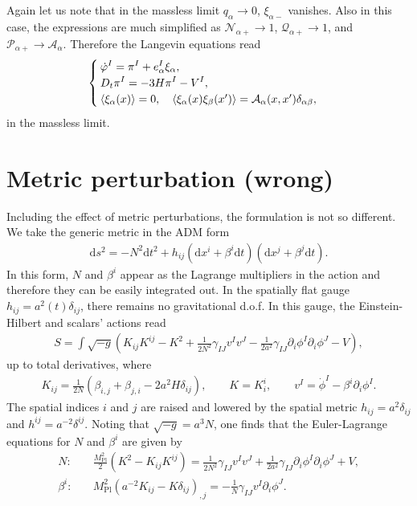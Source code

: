 \documentclass[aps, prd
, preprint
, nofootinbib 
]{revtex4-1}
\newcommand{\dd}{\mathrm{d}}
\newcommand{\Mpl}{M_\text{Pl}}
\newcommand{\bae}[1]{\begin{align} #1 \end{align}}
\newcommand{\bce}[1]{\begin{cases} #1 \end{cases}}
\begin{document}
Again let us note that in the massless limit $q_\alpha\to0$, $\xi_{\alpha-}$ vanishes.
Also in this case, the expressions are much simplified as $\mathcal{N}_{\alpha+}\to1$, $\mathscr{Q}_{\alpha+}\to1$,
and $\mathcal{P}_{\alpha+}\to\mathcal{A}_\alpha$. Therefore the Langevin equations read
\bae{\label{eq: massless}
	\bce{
		\displaystyle
		\dot{\varphi}^I=\pi^I+e^I_\alpha\xi_\alpha, \\
		\displaystyle
		D_t\pi^I=-3H\pi^I-V^I, \\
		\braket{\xi_\alpha(x)}=0, \quad \braket{\xi_\alpha(x)\xi_\beta(x^\prime)}=\mathcal{A}_\alpha(x,x^\prime)\delta_{\alpha\beta},
	}
}
in the massless limit.




\section{Metric perturbation (wrong)}

Including the effect of metric perturbations, the formulation is not so different.
We take the generic metric in the ADM form
\bae{
	\dd s^2=-N^2\dd t^2+h_{ij}(\dd x^i+\beta^i\dd t)(\dd x^j+\beta^j\dd t).
}
In this form, $N$ and $\beta^i$ appear as the Lagrange multipliers in the action and therefore they can be easily integrated out.
In the spatially flat gauge $h_{ij}=a^2(t)\delta_{ij}$, there remains no gravitational d.o.f.
In this gauge, the Einstein-Hilbert and scalars' actions read
\bae{\label{eq: action in ADM}
	S=\int\sqrt{-g}\left(K_{ij}K^{ij}-K^2+\frac{1}{2N^2}\gamma_{IJ}v^Iv^J-\frac{1}{2a^2}\gamma_{IJ}\partial_i\phi^I\partial_i\phi^J-V\right),
}
up to total derivatives, where
\bae{
	K_{ij}=\frac{1}{2N}\left(\beta_{i,j}+\beta_{j,i}-2a^2H\delta_{ij}\right), \quad\quad K=K^i_i, \quad\quad v^I=\dot{\phi}^I-\beta^i\partial_i\phi^I.
}
The spatial indices $i$ and $j$ are raised and lowered by the spatial metric $h_{ij}=a^2\delta_{ij}$ and $h^{ij}=a^{-2}\delta^{ij}$.
Noting that $\sqrt{-g}=a^3N$, one finds that the Euler-Lagrange equations for $N$ and $\beta^i$ are given by
\bae{
	N:&\quad \frac{\Mpl^2}{2}\left(K^2-K_{ij}K^{ij}\right)=\frac{1}{2N^2}\gamma_{IJ}v^Iv^J+\frac{1}{2a^2}\gamma_{IJ}\partial_i\phi^I\partial_i\phi^J+V, 
	\label{eq: EL for N} \\
	\beta^i:&\quad \Mpl^2\left(a^{-2}K_{ij}-K\delta_{ij}\right)_{,j}=-\frac{1}{N}\gamma_{IJ}v^I\partial_i\phi^J. \label{eq: EL for beta}
}
\end{document}
